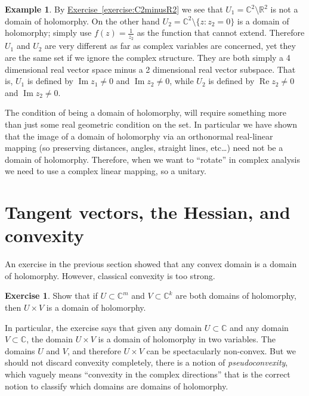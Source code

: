 \documentclass[12pt,openany]{book}
\renewcommand{\Re}{\operatorname{Re}}
\renewcommand{\Im}{\operatorname{Im}}
\newcommand{\C}{{\mathbb{C}}}
\newcommand{\R}{{\mathbb{R}}}
\theoremstyle{plain}
\theoremstyle{remark}
\theoremstyle{definition}
\newenvironment{exbox}{%
    \def\FrameCommand{\vrule width 1pt \relax\hspace {10pt}}%
    \MakeFramed {\advance \hsize -\width \FrameRestore }%
}{%
    \endMakeFramed
}
\theoremstyle{exercise}
\newtheorem{exercise}{Exercise}[section]
\theoremstyle{example}
\newtheorem{example}[thm]{Example}
\newcommand{\exerciseref}[1]{\hyperref[#1]{Exercise~\ref*{#1}}}
\begin{document}
\begin{example}
By
\exerciseref{exercise:C2minusR2} we see
that
$U_1 = \C^2 \setminus \R^2$
is not a domain of holomorphy.  On the other hand
$U_2 = \C^2 \setminus \{ z : z_2 = 0 \}$ is a domain of holomorphy;
simply
use $f(z) = \frac{1}{z_2}$ as the function that cannot extend.
Therefore $U_1$ and $U_2$ are very different as far as complex variables are
concerned, yet they are the same set if we ignore the complex structure.
They are both simply a 4 dimensional real vector space minus a 2 dimensional
real vector subspace.  That is, $U_1$ is defined by
$\Im z_1 \not= 0$ and $\Im z_2 \not= 0$,
while $U_2$ is defined by
$\Re z_2 \not= 0$ and $\Im z_2 \not= 0$.

The condition of being a domain of holomorphy,
will require something more than just some real geometric condition on the
set.  In particular we have shown that the image of a domain of holomorphy
via an orthonormal
real-linear mapping 
(so preserving distances, angles, straight lines, etc\ldots)
need not be a domain of holomorphy.  Therefore, when we want to
``rotate'' in complex analysis we need to use a complex linear mapping,
so a unitary.
\end{example}


\section{Tangent vectors, the Hessian, and convexity}

An exercise in the previous section showed that any convex domain is a
domain of holomorphy.  However, classical convexity is too strong.

\begin{exbox}
\begin{exercise}
Show that if $U \subset \C^m$ and $V \subset \C^k$ are both domains of
holomorphy, then $U \times V$ is a domain of holomorphy.
\end{exercise}
\end{exbox}

In particular, the exercise says that
given any domain $U \subset \C$ and any domain $V \subset \C$, the domain
$U \times V$ is a domain of holomorphy in two variables.  The domains
$U$ and $V$, and therefore $U \times V$ can be spectacularly non-convex.
But we should not discard convexity completely, there is a notion of
\emph{pseudoconvexity}, which vaguely means ``convexity in the 
complex directions'' that is the correct notion to classify which
domains are domains of holomorphy.
\end{document}

